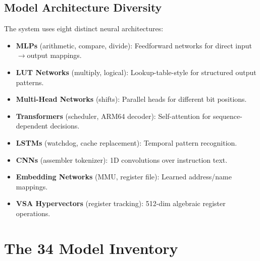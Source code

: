 \documentclass[11pt,a4paper]{article}
\begin{document}
\subsection{Model Architecture Diversity}

The system uses eight distinct neural architectures:

\begin{itemize}[itemsep=2pt]
    \item \textbf{MLPs} (arithmetic, compare, divide): Feedforward networks for direct input$\to$output mappings.
    \item \textbf{LUT Networks} (multiply, logical): Lookup-table-style for structured output patterns.
    \item \textbf{Multi-Head Networks} (shifts): Parallel heads for different bit positions.
    \item \textbf{Transformers} (scheduler, ARM64 decoder): Self-attention for sequence-dependent decisions.
    \item \textbf{LSTMs} (watchdog, cache replacement): Temporal pattern recognition.
    \item \textbf{CNNs} (assembler tokenizer): 1D convolutions over instruction text.
    \item \textbf{Embedding Networks} (MMU, register file): Learned address/name mappings.
    \item \textbf{VSA Hypervectors} (register tracking): 512-dim algebraic register operations.
\end{itemize}

\section{The 34 Model Inventory}
\end{document}
